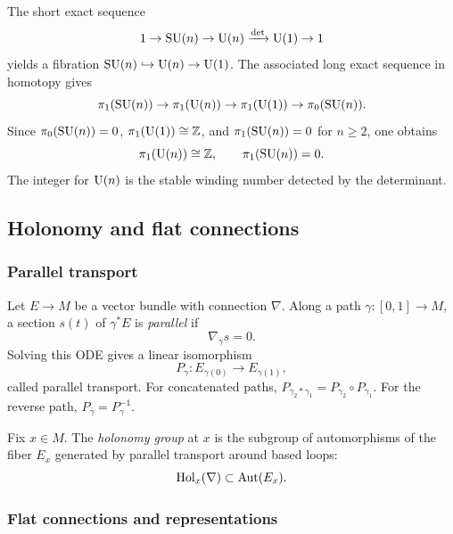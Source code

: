 The short exact sequence
\begin{equation}
  1 \to \operatorname{SU}(n) \to \operatorname{U}(n) \xrightarrow{\det} \operatorname{U}(1) \to 1
\end{equation}
yields a fibration $\operatorname{SU}(n) \hookrightarrow \operatorname{U}(n) \to \operatorname{U}(1)$. The associated long exact sequence in homotopy gives
\begin{equation}
  \pi_1(\operatorname{SU}(n)) \to \pi_1(\operatorname{U}(n)) \to \pi_1(\operatorname{U}(1)) \to \pi_0(\operatorname{SU}(n)).
\end{equation}
Since $\pi_0(\operatorname{SU}(n))=0$, $\pi_1(\operatorname{U}(1))\cong \mathbb{Z}$, and $\pi_1(\operatorname{SU}(n))=0$ for $n\ge 2$, one obtains
\begin{equation}
  \pi_1(\operatorname{U}(n))\cong \mathbb{Z},
  \qquad
  \pi_1(\operatorname{SU}(n))=0.
\end{equation}
The integer for $\operatorname{U}(n)$ is the stable winding number detected by the determinant.

\subsection{Holonomy and flat connections}

\subsubsection{Parallel transport}

Let $E \to M$ be a vector bundle with connection $\nabla$. Along a path $\gamma : [0,1] \to M$, a section $s(t)$ of $\gamma^*E$ is \emph{parallel} if
\begin{equation}
  \nabla_{\dot\gamma} s = 0.
\end{equation}
Solving this ODE gives a linear isomorphism
\begin{equation}
  P_\gamma : E_{\gamma(0)} \to E_{\gamma(1)},
\end{equation}
called parallel transport. For concatenated paths, $P_{\gamma_2 * \gamma_1}=P_{\gamma_2}\circ P_{\gamma_1}$. For the reverse path, $P_{\overline\gamma}=P_\gamma^{-1}$.

Fix $x\in M$. The \emph{holonomy group} at $x$ is the subgroup of automorphisms of the fiber $E_x$ generated by parallel transport around based loops:
\begin{equation}
  \operatorname{Hol}_x(\nabla) \subset \operatorname{Aut}(E_x).
\end{equation}

\subsubsection{Flat connections and representations}

